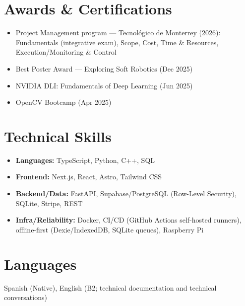 \documentclass[10pt,letterpaper]{article}
\begin{document}
\section*{Awards \& Certifications}
\begin{itemize}[leftmargin=*]
  \item Project Management program — Tecnológico de Monterrey (2026): Fundamentals (integrative exam), Scope, Cost, Time \& Resources, Execution/Monitoring \& Control
  \item Best Poster Award — Exploring Soft Robotics (Dec 2025)
  \item NVIDIA DLI: Fundamentals of Deep Learning (Jun 2025)
  \item OpenCV Bootcamp (Apr 2025)
\end{itemize}

\section*{Technical Skills}
\begin{itemize}[leftmargin=*]
  \item \textbf{Languages:} TypeScript, Python, C++, SQL
  \item \textbf{Frontend:} Next.js, React, Astro, Tailwind CSS
  \item \textbf{Backend/Data:} FastAPI, Supabase/PostgreSQL (Row-Level Security), SQLite, Stripe, REST
  \item \textbf{Infra/Reliability:} Docker, CI/CD (GitHub Actions self-hosted runners), offline-first (Dexie/IndexedDB, SQLite queues), Raspberry Pi
\end{itemize}

\section*{Languages}
Spanish (Native), English (B2; technical documentation and technical conversations)
\end{document}

